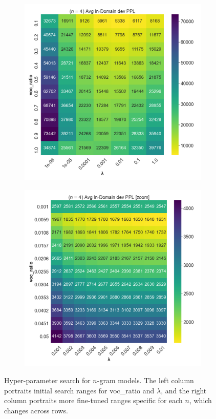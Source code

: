 \documentclass[11pt]{article}
\begin{document}
\begin{figure}[ht]
\begin{subfigure}{0.5\textwidth}
  \includegraphics[width=\textwidth]{figures/n=4.png}
\end{subfigure}
\begin{subfigure}{0.5\textwidth}
  \includegraphics[width=\textwidth]{figures/n=4_zoom.png}
\end{subfigure}
\caption{Hyper-parameter search for $n$-gram models. The left column portraits initial search ranges for \textsf{voc\_ratio} and $\lambda$, and the right column portraits more fine-tuned ranges specific for each $n$, which changes across rows.}
\label{fig:search}
\end{figure}
\end{document}
